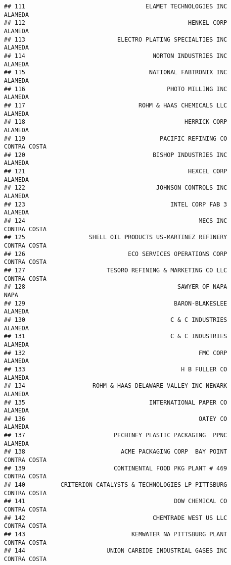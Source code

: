 \documentclass[
]{book}
\begin{document}
\begin{verbatim}
## 111                                  ELAMET TECHNOLOGIES INC       ALAMEDA
## 112                                              HENKEL CORP       ALAMEDA
## 113                          ELECTRO PLATING SPECIALTIES INC       ALAMEDA
## 114                                    NORTON INDUSTRIES INC       ALAMEDA
## 115                                   NATIONAL FABTRONIX INC       ALAMEDA
## 116                                        PHOTO MILLING INC       ALAMEDA
## 117                                ROHM & HAAS CHEMICALS LLC       ALAMEDA
## 118                                             HERRICK CORP       ALAMEDA
## 119                                      PACIFIC REFINING CO  CONTRA COSTA
## 120                                    BISHOP INDUSTRIES INC       ALAMEDA
## 121                                              HEXCEL CORP       ALAMEDA
## 122                                     JOHNSON CONTROLS INC       ALAMEDA
## 123                                         INTEL CORP FAB 3       ALAMEDA
## 124                                                 MECS INC  CONTRA COSTA
## 125                  SHELL OIL PRODUCTS US-MARTINEZ REFINERY  CONTRA COSTA
## 126                             ECO SERVICES OPERATIONS CORP  CONTRA COSTA
## 127                       TESORO REFINING & MARKETING CO LLC  CONTRA COSTA
## 128                                           SAWYER OF NAPA          NAPA
## 129                                          BARON-BLAKESLEE       ALAMEDA
## 130                                         C & C INDUSTRIES       ALAMEDA
## 131                                         C & C INDUSTRIES       ALAMEDA
## 132                                                 FMC CORP       ALAMEDA
## 133                                            H B FULLER CO       ALAMEDA
## 134                   ROHM & HAAS DELAWARE VALLEY INC NEWARK       ALAMEDA
## 135                                   INTERNATIONAL PAPER CO       ALAMEDA
## 136                                                 OATEY CO       ALAMEDA
## 137                         PECHINEY PLASTIC PACKAGING  PPNC       ALAMEDA
## 138                           ACME PACKAGING CORP  BAY POINT  CONTRA COSTA
## 139                         CONTINENTAL FOOD PKG PLANT # 469  CONTRA COSTA
## 140          CRITERION CATALYSTS & TECHNOLOGIES LP PITTSBURG  CONTRA COSTA
## 141                                          DOW CHEMICAL CO  CONTRA COSTA
## 142                                    CHEMTRADE WEST US LLC  CONTRA COSTA
## 143                              KEMWATER NA PITTSBURG PLANT  CONTRA COSTA
## 144                       UNION CARBIDE INDUSTRIAL GASES INC  CONTRA COSTA

\end{verbatim}
\end{document}
